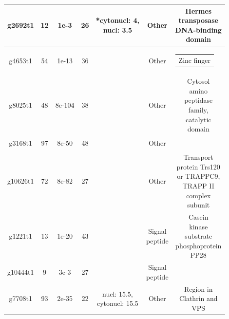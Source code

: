 \documentclass{article}
\makeatletter
\newcommand{\specialcell}[2][c]{%
	\begin{tabular}[#1]{@{}c@{}}#2\end{tabular}}
\makeatother
\begin{document}
\begin{longtable}[H!]{|c|c|c|c|c|c|c|}
   		g2692t1 & 12  &	1e-3 & 26  & \specialcell{*cytonucl: 4, \\  nucl: 3.5}  & Other & \specialcell{ Hermes \\ 
   			transposase \\ 
   			DNA-binding \\ 
   			domain}  \\ 
 \hline
 	
   		g4653t1 & 54 &	1e-13 & 36  & \specialcell{ }  & Other & \specialcell{Zinc finger }  \\ 
\hline

 
 
   		g8025t1 & 48   &	8e-104 & 38  & \specialcell{  }  & Other & \specialcell{ Cytosol \\
   			amino
   			\\ peptidase \\
   			family, \\ catalytic \\
   			domain}  \\ 
 \hline
 
   		g3168t1 & 97   &	8e-50 & 48  & \specialcell{   }  & Other & \specialcell{ }  \\ 
 \hline
 
   		g10626t1 & 72  &	8e-82 & 27  & \specialcell{  }  & Other & \specialcell{ Transport \\ 
   			protein Trs120 \\ 
   			or TRAPPC9, \\
   			TRAPP II \\ 
   			complex \\ 
   			subunit}  \\ 
 \hline

    		g1221t1 & 13  &	1e-20 & 43  & \specialcell{  }  &  \specialcell{Signal \\ peptide}  & \specialcell{ Casein \\ kinase \\
    			substrate \\ 
    			phosphoprotein \\ 
    			PP28}  \\ 
 \hline
 
    		g10444t1 & 9  &	3e-3 & 27  & \specialcell{ }  &  \specialcell{Signal \\ peptide} & \specialcell{  }  \\ 
 \hline
 
 
    		g7708t1 & 93  &	2e-35 & 22  & \specialcell{ nucl: 15.5,\\ cytonucl: 15.5 }  & Other & \specialcell{ Region in \\
    			Clathrin and \\
    			VPS}  \\ 
 \hline
  

\end{longtable}
\end{document}
